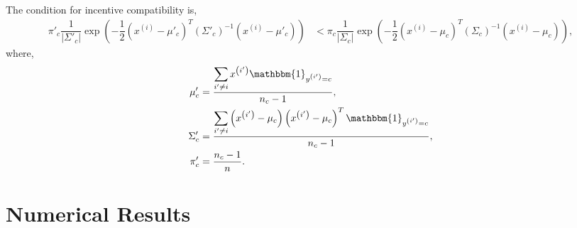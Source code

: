 \documentclass{article}
\begin{document}
The condition for incentive compatibility is,
\begin{align*}
\pi'_{c} \dfrac{1}{\left| \Sigma'_{c} \right|} \exp\left(- \dfrac{1}{2} \left(x^{\left(i\right)} - \mu'_{c}\right)^{T} \left(\Sigma'_{c}\right)^{-1} \left(x^{\left(i\right)} - \mu'_{c}\right)\right) &< \pi_{c} \dfrac{1}{\left| \Sigma_{c} \right|} \exp\left(- \dfrac{1}{2} \left(x^{\left(i\right)} - \mu_{c}\right)^{T} \left(\Sigma_{c}\right)^{-1} \left(x^{\left(i\right)} - \mu_{c}\right)\right),
\end{align*}
where,
\begin{align*}
\mu'_{c} &= \dfrac{\displaystyle\sum_{i' \neq  i} x^{\left(i'\right)} \mathbbm{1}_{y^{\left(i'\right)} = c}}{n_{c} - 1},
\\ \Sigma'_{c} &= \dfrac{\displaystyle\sum_{i' \neq  i} \left(x^{\left(i'\right)} - \mu_{c}\right) \left(x^{\left(i'\right)} - \mu_{c}\right)^{T} \mathbbm{1}_{y^{\left(i'\right)} = c}}{n_{c} - 1},
\\ \pi'_{c} &= \dfrac{n_{c} - 1}{n} .
\end{align*}




\section{Numerical Results} 
\end{document}
